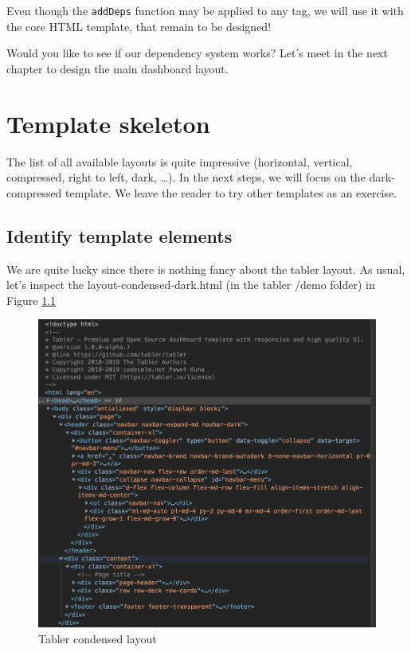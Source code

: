 \documentclass[
]{book}
\begin{document}
Even though the \texttt{addDeps} function may be applied to any tag, we will use it with the core HTML template, that remain to be designed!

Would you like to see if our dependency system works? Let's meet in the next chapter to design the main dashboard layout.

\hypertarget{custom-templates-skeleton}{%
\chapter{Template skeleton}\label{custom-templates-skeleton}}

The list of all available layouts is quite impressive (horizontal, vertical, compressed, right to left, dark, \ldots). In the next steps, we will focus on the dark-compressed template. We leave the reader to try other templates as an exercise.

\hypertarget{identify-template-elements}{%
\section{Identify template elements}\label{identify-template-elements}}

We are quite lucky since there is nothing fancy about the tabler layout. As usual, let's inspect the layout-condensed-dark.html (in the tabler /demo folder) in Figure \ref{fig:tabler-layout-intro}

\begin{figure}
\includegraphics[width=17.56in]{images/practice/tabler-layout-intro} \caption{Tabler condensed layout}\label{fig:tabler-layout-intro}
\end{figure}
\end{document}
